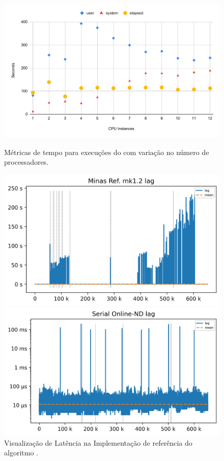 \begin{figure}[htb]
  \centering
  \begin{minipage}{0.49\textwidth}
    \centering
    \includegraphics[width=1\linewidth,page=1]{experiments/speedup-clean.pdf}
    \caption{Métricas de tempo para execuções do \mfog com variação no número de processadores.}
    \label{fig:speedup}
  \end{minipage}
  \hfill
  \begin{minipage}{0.49\textwidth}
    \centering
    \includegraphics[width=1\linewidth]{experiments/lag-java.png}
    \caption{Visualização de Latência na Implementação de referência do algoritmo \minas.}
    \label{fig:lag-java}
  \end{minipage}
  \vspace{5mm}
  \begin{minipage}{0.49\textwidth}
    \centering
    \includegraphics[width=1\linewidth]{experiments/lag-serial.png}

\end{minipage}
\end{figure}
